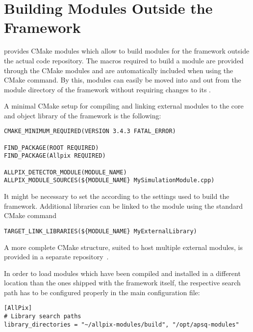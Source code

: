 \section{Building Modules Outside the Framework}

\apsq provides CMake modules which allow to build modules for the framework outside the actual code repository.
The macros required to build a module are provided through the CMake modules and are automatically included when using the  CMake command.
By this, modules can easily be moved into and out from the module directory of the framework without requiring changes to its .

A minimal CMake setup for compiling and linking external modules to the core and object library of the \apsq framework is the following:

\begin{verbatim}
CMAKE_MINIMUM_REQUIRED(VERSION 3.4.3 FATAL_ERROR)

FIND_PACKAGE(ROOT REQUIRED)
FIND_PACKAGE(Allpix REQUIRED)

ALLPIX_DETECTOR_MODULE(MODULE_NAME)
ALLPIX_MODULE_SOURCES(${MODULE_NAME} MySimulationModule.cpp)
\end{verbatim}

It might be necessary to set the  according to the settings used to build the framework.
Additional libraries can be linked to the module using the standard CMake command
\begin{verbatim}
TARGET_LINK_LIBRARIES(${MODULE_NAME} MyExternalLibrary)
\end{verbatim}

A more complete CMake structure, suited to host multiple external modules, is provided in a separate repository~\cite{ap2-external-modules}.

In order to load modules which have been compiled and installed in a different location than the ones shipped with the framework itself, the respective search path has to be configured properly in the \apsq main configuration file:

\begin{verbatim}
[AllPix]
# Library search paths
library_directories = "~/allpix-modules/build", "/opt/apsq-modules"
\end{verbatim}

